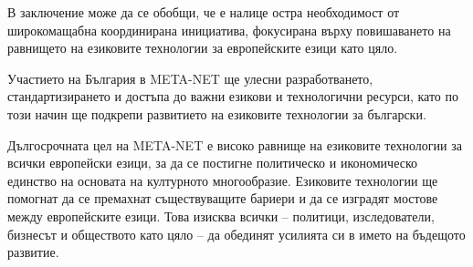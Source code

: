 \documentclass[]{../../metanetpaper}
\begin{document}
\begin{multicols}{2}
В заключение може да се обобщи, че е налице остра необходимост от
широкомащабна координирана инициатива, фокусирана върху повишаването
на равнището на езиковите технологии за европейските езици като цяло.

\columnbreak
Участието на България в META-NET ще улесни разработването,
стандартизирането и достъпа до важни езикови и технологични ресурси,
като по този начин ще подкрепи развитието на езиковите технологии за
български.

Дългосрочната цел на META-NET е високо равнище на езиковите технологии
за всички европейски езици, за да се постигне политическо и
икономическо единство на основата на културното
многообразие. Езиковите технологии ще помогнат да се премахнат
съществуващите бариери и да се изградят мостове между европейските
езици. Това изисква всички -- политици, изследователи, бизнесът и
обществото като цяло -- да обединят усилията си в името на бъдещото
развитие.
\end{multicols}

\clearpage
\end{document}
